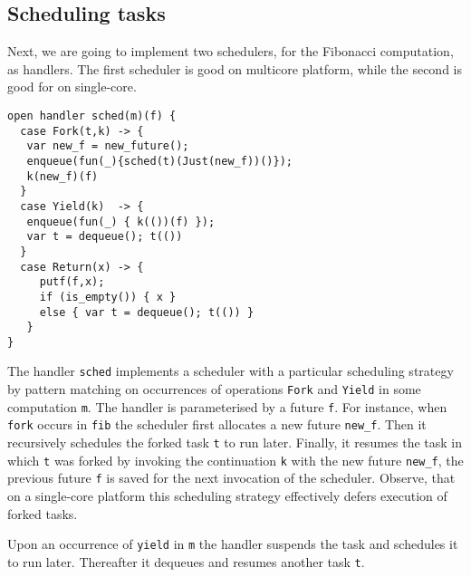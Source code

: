 \documentclass[preprint,10pt,numbers]{sigplanconf}
\begin{document}
\subsection{Scheduling tasks}\label{sec:sched}
Next, we are going to implement two schedulers, for the Fibonacci computation, as handlers.
The first scheduler is good on multicore platform, while the second is good for on single-core.
\begin{lstlisting}[style={links},caption={}]
open handler sched(m)(f) {
  case Fork(t,k) -> {
   var new_f = new_future();
   enqueue(fun(_){sched(t)(Just(new_f))()});
   k(new_f)(f)
  }
  case Yield(k)  -> { 
   enqueue(fun(_) { k(())(f) }); 
   var t = dequeue(); t(()) 
  }
  case Return(x) -> {
     putf(f,x);
     if (is_empty()) { x }
     else { var t = dequeue(); t(()) }
   } 
}
\end{lstlisting}
The handler \texttt{sched} implements a scheduler with a particular scheduling strategy by pattern matching on occurrences of operations \texttt{Fork} and \texttt{Yield} in some computation \texttt{m}. The handler is parameterised by a future \texttt{f}. For instance, when \texttt{fork} occurs in \texttt{fib} the scheduler first allocates a new future \texttt{new\_f}. Then it recursively schedules the forked task \texttt{t} to run later. Finally, it resumes the task in which \texttt{t} was forked by invoking the continuation \texttt{k} with the new future \texttt{new\_f}, the previous future \texttt{f} is saved for the next invocation of the scheduler. Observe, that on a single-core platform this scheduling strategy effectively defers execution of forked tasks.

Upon an occurrence of \texttt{yield} in \texttt{m} the handler suspends the task and schedules it to run later. Thereafter it dequeues and resumes another task \texttt{t}.
\end{document}
